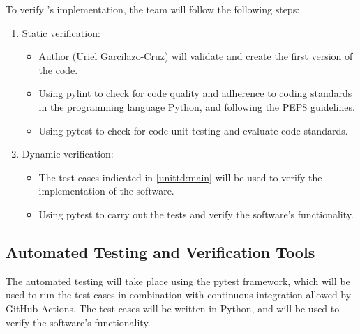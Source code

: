 \documentclass[12pt, titlepage]{article}
\begin{document}
To verify \progname{}'s implementation, the team will follow the following steps:
\begin{enumerate}
  \item Static verification:
  \begin{itemize}
    \item Author (Uriel Garcilazo-Cruz) will validate and create the first version of the code.
    \item Using pylint to check for code quality and adherence to coding standards in the
    programming language Python, and following the PEP8 guidelines.
    \item Using pytest to check for code unit testing and evaluate code standards.
  \end{itemize}
  
  \item Dynamic verification:
  \begin{itemize}
    \item The test cases indicated in \autoref{unittd:main} will be used to verify the implementation of the software.
    \item Using pytest to carry out the tests and verify the software's functionality.
  \end{itemize}

\end{enumerate}




\subsection{Automated Testing and Verification Tools}

The automated testing will take place using the pytest framework, which will be used to run the test cases
in combination with continuous integration allowed by GitHub Actions. The test cases will be written in Python,
and will be used to verify the software's functionality.
\end{document}
